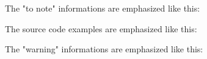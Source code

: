 \noindent The "to note" informations are emphasized like this:\\

\bigskip

\noindent The source code examples are emphasized like this:\\

\bigskip

\noindent The "warning" informations are emphasized like this:\\

